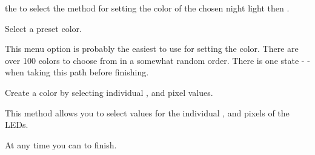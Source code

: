  the  to select the method for setting the color of the chosen
night light then .


 \par\medskip

Select a preset color.

\par\medskip

This menu option is probably the easiest to use for setting the color.  There
are over \num{100} colors to choose from in a somewhat random order.  There is
one state -  - when taking this path before finishing.


 \par\medskip

Create a color by selecting individual ,  and  pixel
values.

\par\medskip

This method allows you to select values for the individual , 
and  pixels of the LEDs.


At any time you can  to finish.

